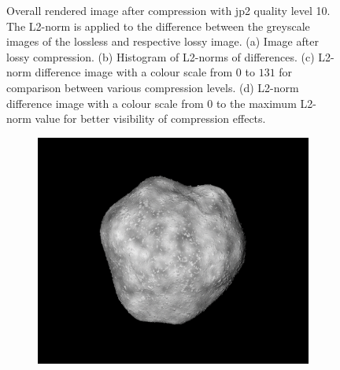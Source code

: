 \begin{figure}[htb]
\begin{subfigure}[b]{0.48\textwidth}
        \caption{}
        \label{fig:img_quality_comp_jp2_10_diff_rel}
    \end{subfigure}
    \caption{Overall rendered image after compression with \gls{jp2} quality level 10. The L2-norm is applied to the difference between the greyscale images of the lossless and respective lossy image. (a) Image after lossy compression. (b) Histogram of L2-norms of differences. (c) L2-norm difference image with a colour scale from $0$ to $131$ for comparison between various compression levels. (d) L2-norm difference image with a colour scale from $0$ to the maximum L2-norm value for better visibility of compression effects.}
    \label{fig:img_quality_comp_jp2_10}
\end{figure}

\begin{figure}[htb]
    \centering
    \begin{subfigure}[b]{0.48\textwidth}
        \centering
        \includegraphics[width=\textwidth]{doc/thesis/0_figures/compare_quality/set1/jp2_100.png}
        \caption{}
        \label{fig:img_quality_comp_jp2_100_orig}
    \end{subfigure}
    \begin{subfigure}[b]{0.48\textwidth}
        \centering

\end{subfigure}
\end{figure}
